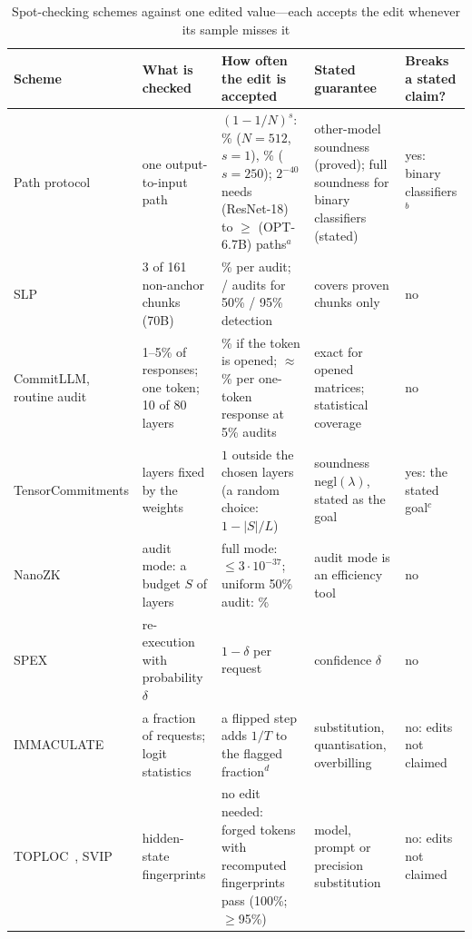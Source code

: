\begin{table}[t]
  \caption{Spot-checking schemes against one edited value---each accepts the edit whenever its sample misses it}
  \label{tab:sok}
  \footnotesize
  \setlength{\tabcolsep}{4pt}
  \def\rr{\raggedright}%
  \begin{tabular}{@{}p{2.45cm}p{2.9cm}p{5.4cm}p{3.8cm}p{2.0cm}@{}}
    \toprule
    \rr Scheme & \rr What is checked & \rr How often the edit is accepted & \rr Stated guarantee &
      \rr Breaks a stated claim? \tabularnewline
    \midrule
    \rr Path protocol~\cite{anchuri2026verifiable} &
      \rr one output-to-input path &
      \rr $(1-1/N)^s$: \SokPathOne{}\% ($N{=}512$, $s{=}1$), \SokPathMany{}\% ($s{=}250$); $2^{-40}$ needs \SokPathsWide{}
      (ResNet-18) to $\ge$\SokPathsOptL{} (OPT-6.7B) paths$^a$ &
      \rr other-model soundness (proved); full soundness for binary classifiers (stated) &
      \rr yes: binary classifiers$^b$ \tabularnewline
    \addlinespace
    \rr SLP~\cite{slp} &
      \rr 3 of 161 non-anchor chunks (70B) &
      \rr \SokSlpAudit{}\% per audit; \SokSlpAuditsHalf{} / \SokSlpAuditsMost{} audits for 50\% / 95\% detection &
      \rr covers proven chunks only &
      \rr no \tabularnewline
    \addlinespace
    \rr CommitLLM, routine audit~\cite{commitllm2026} &
      \rr 1--5\% of responses; one token; 10 of 80 layers &
      \rr \SokCommitOpened{}\% if the token is opened; $\approx$\SokCommitRateAbout{}\% per one-token response at 5\% audits &
      \rr exact for opened matrices; statistical coverage &
      \rr no \tabularnewline
    \addlinespace
    \rr \mbox{TensorCommitments} \cite{tensorcommitments} &
      \rr layers fixed by the weights &
      \rr $1$ outside the chosen layers (a random choice: $1-|S|/L$) &
      \rr soundness $\mathrm{negl}(\lambda)$, stated as the goal &
      \rr yes: the stated goal$^c$ \tabularnewline
    \addlinespace
    \rr NanoZK~\cite{nanozk} &
      \rr audit mode: a budget $S$ of layers &
      \rr full mode: $\le 3\cdot10^{-37}$; uniform 50\% audit: \SokNanoAudit{}\% &
      \rr audit mode is an efficiency tool &
      \rr no \tabularnewline
    \addlinespace
    \rr SPEX~\cite{spex} &
      \rr re-execution with probability $\delta$ &
      \rr $1-\delta$ per request &
      \rr confidence $\delta$ &
      \rr no \tabularnewline
    \addlinespace
    \rr IMMACULATE \cite{immaculate} &
      \rr a fraction of requests; logit statistics &
      \rr a flipped step adds $1/T$ to the flagged fraction$^d$ &
      \rr substitution, quantisation, overbilling &
      \rr no: edits not claimed \tabularnewline
    \addlinespace
    \rr TOPLOC~\cite{toploc}, SVIP~\cite{svip} &
      \rr hidden-state fingerprints &
      \rr no edit needed: forged tokens with recomputed fingerprints pass (100\%; $\ge$95\%) &
      \rr model, prompt or precision substitution &
      \rr no: edits not claimed \tabularnewline
    \bottomrule
  \end{tabular}


\end{table}
